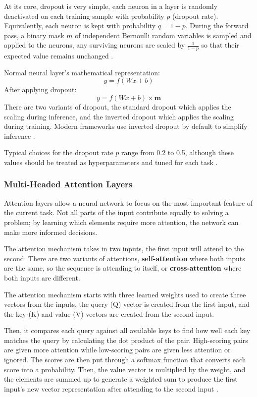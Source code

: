 At its core, dropout is very simple, each neuron in a layer is randomly deactivated on each training sample with probability $p$ (dropout rate). Equivalently, each neuron is kept with probability $q=1-p$. During the forward pass, a binary mask $m$ of independent Bernoulli random variables is sampled and applied to the neurons, any surviving neurons are scaled by $\frac{1}{1-p}$ so that their expected value remains unchanged \cite{DropoutPaper}.

Normal neural layer's mathematical representation:
$$y = f(Wx + b)$$
After applying dropout:
$$y=f(Wx+b)\times \textbf{m}$$
There are two variants of dropout, the standard dropout which applies the scaling during inference, and the inverted dropout which applies the scaling during training. Modern frameworks use inverted dropout by default to simplify inference \cite{TensorflowDropout, PyTorchDropout}.

Typical choices for the dropout rate $p$ range from 0.2 to 0.5, although these values should be treated as hyperparameters and tuned for each task \cite{DropoutPaper}.

\subsubsection{Multi-Headed Attention Layers} \label{ML:AttentionMechanism}
Attention layers allow a neural network to focus on the most important feature of the current task. Not all parts of the input contribute equally to solving a problem; by learning which elements require more attention, the network can make more informed decisions. 

The attention mechanism takes in two inputs, the first input will attend to the second. There are two variants of attentions, \textbf{self-attention} where both inputs are the same, so the sequence is attending to itself, or \textbf{cross-attention} where both inputs are different.

The attention mechanism starts with three learned weights used to create three vectors from the inputs, the query (Q) vector is created from the first input, and the key (K) and value (V) vectors are created from the second input. 

Then, it compares each query against all available keys to find how well each key matches the query by calculating the dot product of the pair. High-scoring pairs are given more attention while low-scoring pairs are given less attention or ignored. The scores are then put through a softmax function that converts each score into a probability. Then, the value vector is multiplied by the weight, and the elements are summed up to generate a weighted sum to produce the first input's new vector representation after attending to the second input \cite{AttentionIsAllYouNeed}.

